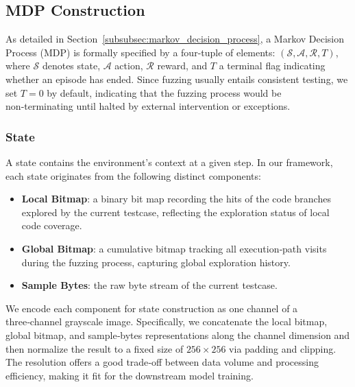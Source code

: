 \documentclass[lettersize,journal]{IEEEtran}
\begin{document}
\subsection{MDP Construction}\label{subsec:mdp_construction}

As detailed in Section \ref{subsubsec:markov_decision_process}, a Markov Decision Process (MDP) is formally specified by a four-tuple of elements: $(\mathcal{S}, \mathcal{A}, \mathcal{R}, T)$, where $\mathcal{S}$ denotes state, $\mathcal{A}$ action, $\mathcal{R}$ reward, and $T$ a terminal flag indicating whether an episode has ended. Since fuzzing usually entails consistent testing, we set $T=0$ by default, indicating that the fuzzing process would be non‑terminating until halted by external intervention or exceptions.

\subsubsection{State}\label{subsubsec:state}
A state contains the environment’s context at a given step. In our framework, each state originates from the following distinct components:
\begin{itemize}
	\item \textbf{Local Bitmap}: a binary bit map recording the hits of the code branches explored by the current testcase, reflecting the exploration status of local code coverage.
	\item \textbf{Global Bitmap}: a cumulative bitmap tracking all execution‑path visits during the fuzzing process, capturing global exploration history.
	\item \textbf{Sample Bytes}: the raw byte stream of the current testcase.
\end{itemize}
We encode each component for state construction as one channel of a three‑channel grayscale image. Specifically, we concatenate the local bitmap, global bitmap, and sample‑bytes representations along the channel dimension and then normalize the result to a fixed size of $256\times256$ via padding and clipping. The resolution offers a good trade‑off between data volume and processing efficiency, making it fit for the downstream model training.
\end{document}
